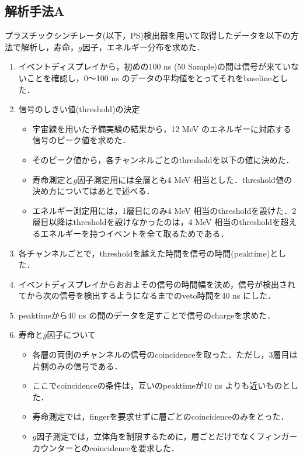   \subsection{解析手法A}
  プラスチックシンチレータ(以下，PS)検出器を用いて取得したデータを以下の方法で解析し，寿命，$g$因子，エネルギー分布を求めた．
  \begin{enumerate}
   \item イベントディスプレイから，初めの100 ns (50 Sample)の間は信号が来ていないことを確認し，0〜100 ns のデータの平均値をとってそれをbaselineとした．
   \item 信号のしきい値(threshold)の決定
	 \begin{itemize}
	  \item 宇宙線を用いた予備実験の結果から，12 MeV のエネルギーに対応する信号のピーク値を求めた．%
	  \item そのピーク値から，各チャンネルごとのthresholdを以下の値に決めた．
	  \item 寿命測定と$g$因子測定用には全層とも4 MeV 相当とした．threshold値の決め方についてはあとで述べる．
	  \item エネルギー測定用には，1層目にのみ4 MeV 相当のthresholdを設けた．2層目以降はthresholdを設けなかったのは，4 MeV 相当のthresholdを超えるエネルギーを持つイベントを全て取るためである．
	 \end{itemize}
   \item 各チャンネルごとで，thresholdを越えた時間を信号の時間(peaktime)とした．
   \item イベントディスプレイからおおよその信号の時間幅を決め，信号が検出されてから次の信号を検出するようになるまでのveto時間を40 ns にした．
   \item peaktimeから40 ns の間のデータを足すことで信号のchargeを求めた．
   \item 寿命と$g$因子について
	 \begin{itemize}
	  \item 各層の両側のチャンネルの信号のcoincidenceを取った．ただし，3層目は片側のみの信号である．
	  \item ここでcoincidenceの条件は，互いのpeaktimeが10 ns よりも近いものとした．
	  \item 寿命測定では，fingerを要求せずに層ごとのcoincidenceのみをとった．
	  \item $g$因子測定では，立体角を制限するために，層ごとだけでなくフィンガーカウンターとのcoincidenceを要求した．

\end{itemize}
\end{enumerate}
